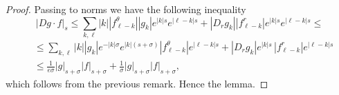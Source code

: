 \documentclass[oneside, 11pt]{amsbook}
\newcommand{\abs}[1]{{\left|#1\right|}}
\newcommand{\teta}{\theta}
\newcommand{\0}{{(0)}}
\newcommand{\3}{{(3)}}
\numberwithin{equation}{section}
\numberwithin{defn}{section}
\numberwithin{prop}{section}
\numberwithin{cor}{section}
\numberwithin{lemma}{section}
\numberwithin{rmk}{section}
\numberwithin{corollary}{section}
\begin{document}
\begin{proof}
	Passing to norms we have the following inequality
	\[\abs{Dg\cdot f}_s\leq \sum_{k,\ell} \abs{k}\abs{f^{\teta}_{\ell - k}}\abs{g_k} e^{\abs{k}s}e^{\abs{\ell-k}s} + \abs{D_r g_k}\abs{f^{r}_{\ell - k}} e^{\abs{k}s}e^{\abs{\ell -k }s}\leq\]
	\begin{align*}
		&\leq \sum_{k,\ell}\abs{k}\abs{g_k} e^{-\abs{k}\sigma} e^{\abs{k}(s+\sigma) }\abs{f^{\teta}_{\ell - k}}  e^{\abs{\ell-k}s} + \abs{D_r g_k}e^{\abs{k}s}\,\abs{f^r_{\ell - k}} e^{\abs{\ell - k}s}\\
		&\leq \frac{1}{e\sigma}\abs{g}_{s+\sigma}\abs{f}_{s+\sigma} + \frac{1}{\sigma}\abs{g}_{s+\sigma}\abs{f}_{s+\sigma},
	\end{align*}
	which follows from the previous remark. Hence the lemma.
\end{proof}



%
\end{document}
